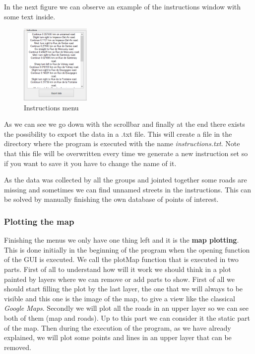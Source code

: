 \documentclass{article}
\begin{document}
In the next figure we can observe an example of the instructions window with some text inside.

\begin{figure}[h]
\centering
\includegraphics[width=0.3\textwidth]{instructions}
\caption{Instructions menu}
\label{fig:instructions}
\end{figure}
 
As we can see we go down with the scrollbar and finally at the end there exists the possibility to export the data in a .txt file. This will create a file in the directory where the program is executed with the name \textit{instructions.txt}. Note that this file will be overwritten every time we generate a new instruction set so if you want to save it you have to change the name of it.

As the data was collected by all the groups and jointed together some roads are missing and sometimes we can find unnamed streets in the instructions. This can be solved by manually finishing the own database of points of interest.

\subsubsection{Plotting the map}

Finishing the menus we only have one thing left and it is the \textbf{map plotting}. This is done initially in the beginning of the program when the opening function of the GUI is executed. We call the plotMap function that is executed in two parts. First of all to understand how will it work we should think in a plot painted by layers where we can remove or add parts to show. First of all we should start filling the plot by the last layer, the one that we will always to be visible and this one is the image of the map, to give a view like the classical \textit{Google Maps}. Secondly we will plot all the roads in an upper layer so we can see both of them (map and roads). Up to this part we can consider it the static part of the map. Then during the execution of the program, as we have already explained, we will plot some points and lines in an upper layer that can be removed.
\end{document}
